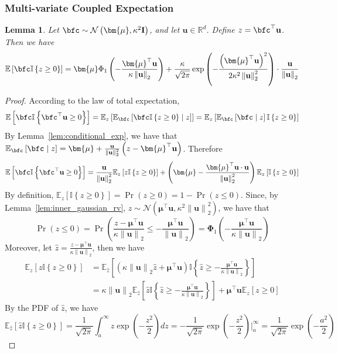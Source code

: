 \documentclass[10pt]{article} %
\newtheorem{lemma}[theorem]{Lemma}
\theoremstyle{definition}
\theoremstyle{plain}
\newcommand{\paren}[1]{\left(#1\right)}
\newcommand{\norm}[1]{\left\|#1\right\|}
\newcommand{\indy}[1]{\mathbb{I}\left\{#1\right\}}
\providecommand{\E}{\mathbb{E}}
\providecommand{\R}{\mathbb{R}}
\def\bfI{{\mathbf{I}}}\def\bfJ{{\mathbf{J}}}\def\bfK{{\mathbf{K}}}\def\bfL{{\mathbf{L}}}
\def\bfu{{\mathbf{u}}}\def\bfv{{\mathbf{v}}}\def\bfw{{\mathbf{w}}}\def\bfx{{\mathbf{x}}}
\begin{document}
\subsubsection{Multi-variate Coupled Expectation}
\begin{lemma}
    \label{lem:first_order_indy_exp}
    Let $\bfc\sim\mathcal{N}\paren{\bm{\mu},\kappa^2\bfI}$, and let $\bfu\in\R^d$. Define $z = \bfc^\top\bfu$. Then we have
    \[
        \E\left[\bfc\indy{z\geq 0}\right] = \bm{\mu}\Phi_1\paren{-\frac{\bm{\mu}^\top\bfu}{\kappa\norm{\bfu}_2}} + \frac{\kappa}{\sqrt{2\pi}}\exp\paren{-\frac{\paren{\bm{\mu}^\top\bfu}^2}{2\kappa^2\norm{\bfu}_2^2}}\cdot\frac{\bfu}{\norm{\bfu}_2}
    \]
\end{lemma}
\begin{proof}
    According to the law of total expectation, 
    \[
        \E\left[\bfc\indy{\bfc^\top\bfu\geq 0}\right] = \E_{z}\left[\E_{\bfc}\left[\bfc\indy{z\geq 0}\mid z\right]\right] = \E_{z}\left[\E_{\bfc}\left[\bfc\mid z\right]\indy{z\geq 0}\right]
    \]
    By Lemma~\ref{lem:conditional_exp}, we have that $\E_{\bfc}\left[\bfc\mid z\right] = \bm{\mu} + \frac{\bfu}{\norm{\bfu}_2^2}\paren{z - \bm{\mu}^\top\bfu}$. Therefore
    \[
        \E\left[\bfc\indy{\bfc^\top\bfu\geq 0}\right] = \frac{\bfu}{\norm{\bfu}_2^2}\E_{z}\left[z\indy{z\geq 0}\right] + \paren{\bm{\mu} - \frac{\bm{\mu}^\top\bfu\cdot\bfu}{\norm{\bfu}_2^2}}\E_{z}\left[\indy{z\geq 0}\right]
    \]
    By definition, $\E_{z}\left[\indy{z\geq 0}\right] = \Pr\paren{z\geq 0} = 1 - \Pr\paren{z\leq 0}$. Since, by Lemma~\ref{lem:inner_gaussian_rv}, $z\sim\mathcal{N}\paren{\bm{\mu}^\top\bfu,\kappa^2\norm{\bfu}_2^2}$, we have that
    \[
        \Pr\paren{z\leq 0} = \Pr\paren{\frac{z-\bm{\mu}^\top\bfu}{\kappa\norm{\bfu}_2}\leq -\frac{\bm{\mu}^\top\bfu}{\norm{\bfu}_2}} = \bm{\Phi}_1\paren{-\frac{\bm{\mu}^\top\bfu}{\kappa\norm{\bfu}_2}}
    \]
    Moreover, let $\hat{z} = \frac{z-\bm{\mu}^\top\bfu}{\kappa\norm{\bfu}_2}$, then we have
    \begin{align*}
        \E_z\left[z\indy{z\geq 0}\right] & =\E_{\hat{z}}\left[\paren{ \kappa\norm{\bfu}_2\hat{z} + \bm{\mu}^\top\bfu}\indy{\hat{z}\geq -\frac{\bm{\mu}^\top\bfu}{\kappa\norm{\bfu}_2}}\right]\\
        & = \kappa\norm{\bfu}_2\E_{\hat{z}}\left[\hat{z}\indy{\hat{z}\geq -\frac{\bm{\mu}^\top\bfu}{\kappa\norm{\bfu}_2}}\right] + \bm{\mu}^\top\bfu\E_z\left[z\geq 0\right]
    \end{align*}
    By the PDF of $\hat{z}$, we have
    \[
        \E_{\hat{z}}\left[\hat{z}\indy{z\geq 0}\right] = \frac{1}{\sqrt{2\pi}}\int_a^\infty z\exp\paren{-\frac{z^2}{2}}dz = -\frac{1}{\sqrt{2\pi}}\exp\paren{-\frac{z^2}{2}}\vert_a^\infty = \frac{1}{\sqrt{2\pi}}\exp\paren{-\frac{a^2}{2}}
\]
\end{proof}
\end{document}
